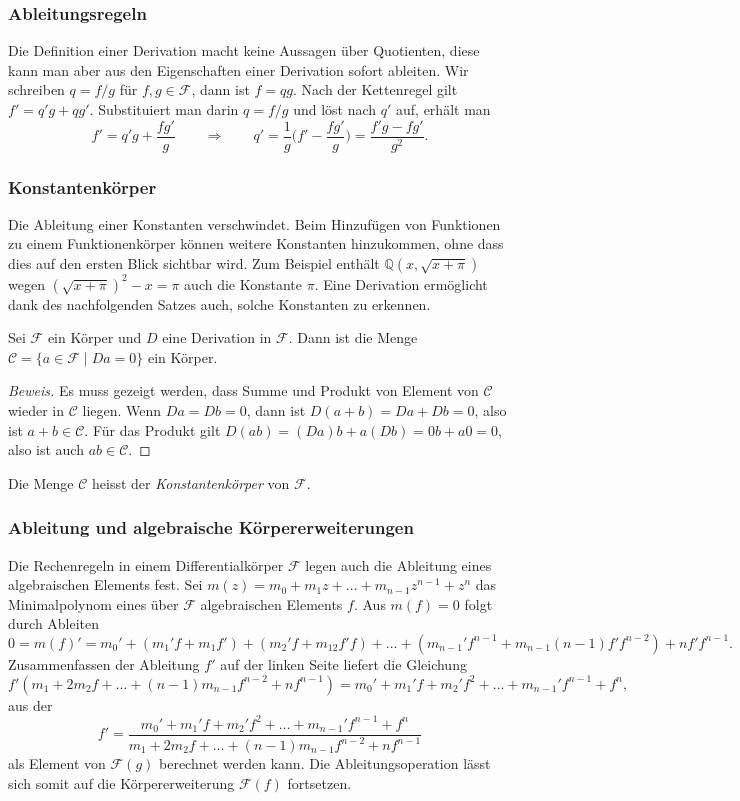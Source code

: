%
%
\subsubsection{Ableitungsregeln}
Die Definition einer Derivation macht keine Aussagen über Quotienten,
diese kann man aber aus den Eigenschaften einer Derivation sofort
ableiten.
Wir schreiben $q=f/g$ für $f,g\in\mathscr{F}$, dann ist $f=qg$.
Nach der Kettenregel gilt
\(
f'=q'g+qg'
\).
Substituiert man darin $q=f/g$ und löst nach $q'$ auf, erhält man
\[
f'=q'g+\frac{fg'}{g}
\qquad\Rightarrow\qquad
q'=\frac1{g}\biggl(f'-\frac{fg'}{g}\biggr)
=
\frac{f'g-fg'}{g^2}.
\]


%
%
\subsubsection{Konstantenkörper}
Die Ableitung einer Konstanten verschwindet.
Beim Hinzufügen von Funktionen zu einem Funktionenkörper können weitere
Konstanten hinzukommen, ohne dass dies auf den ersten Blick sichtbar wird.
Zum Beispiel enthält $\mathbb{Q}(x,\!\sqrt{x+\pi})$ wegen
$(\!\sqrt{x+\pi})^2-x=\pi$ auch die Konstante $\pi$.
Eine Derivation ermöglicht dank des nachfolgenden Satzes auch,
solche Konstanten zu erkennen.

\begin{satz}
Sei $\mathscr{F}$ ein Körper und $D$ eine Derivation in $\mathscr{F}$.
Dann ist die Menge $\mathscr{C}=\{a\in\mathscr{F}\;|\;Da=0\}$ ein Körper.
\end{satz}

\begin{proof}[Beweis]
Es muss gezeigt werden, dass Summe und Produkt von Element von $\mathscr{C}$ 
wieder in $\mathscr{C}$ liegen.
Wenn $Da=Db=0$, dann ist $D(a+b)=Da+Db=0$, also ist $a+b\in \mathscr{C}$.
Für das Produkt gilt $D(ab)=(Da)b+a(Db)=0b+a0=0$, also ist auch
$ab\in \mathscr{C}$.
\end{proof}

Die Menge $\mathscr{C}$ heisst der {\em Konstantenkörper} von $\mathscr{F}$.
%

%
%
\subsubsection{Ableitung und algebraische Körpererweiterungen}
Die Rechenregeln in einem Differentialkörper $\mathscr{F}$ legen auch die
Ableitung eines algebraischen Elements fest.
Sei $m(z)=m_0+m_1z+\ldots+m_{n-1}z^{n-1}+z^n$ das Minimalpolynom eines
über $\mathscr{F}$ algebraischen Elements $f$.
Aus $m(f)=0$ folgt durch Ableiten
\[
0
=
m(f)'
=
m_0'
+
(m_1'f+m_1f')
+
(m_2'f + m_12f'f)
+
\ldots
+
(m_{n-1}'f^{n-1} + m_{n-1} (n-1)f'f^{n-2})
+
nf'f^{n-1}.
\]
Zusammenfassen der Ableitung $f'$ auf der linken Seite liefert die
Gleichung
\[
f'(
m_1+2m_2f+\ldots+(n-1)m_{n-1}f^{n-2}+nf^{n-1}
)
=
m_0' + m_1'f + m_2'f^2 + \ldots + m_{n-1}'f^{n-1} + f^n,
\]
aus der
\[
f'
=
\frac{
m_0' + m_1'f + m_2'f^2 + \ldots + m_{n-1}'f^{n-1} + f^n
}{
m_1+2m_2f+\ldots+(n-1)m_{n-1}f^{n-2}+nf^{n-1}
}
\]
als Element von $\mathscr{F}(g)$ berechnet werden kann.
Die Ableitungsoperation lässt sich somit auf die Körpererweiterung
$\mathscr{F}(f)$ fortsetzen.

